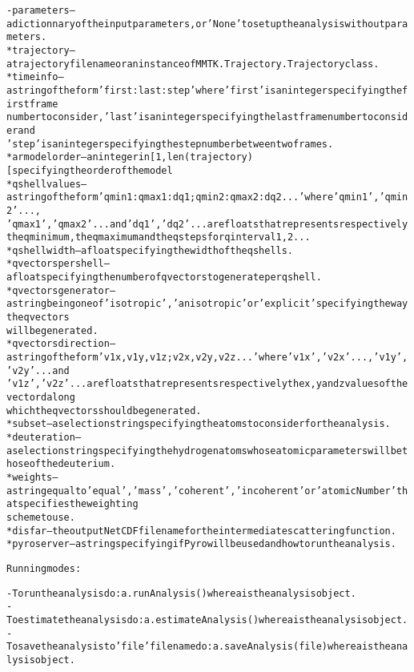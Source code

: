 \begin{alltt}
    - {\textbar}parameters{\textbar} -- a dictionnary of the input parameters, or 'None' to set up the analysis without parameters.
        * trajectory        -- a trajectory file name or an instance of MMTK.Trajectory.Trajectory class.
        * timeinfo          -- a string of the form 'first:last:step' where 'first' is an integer specifying the first frame 
                               number to consider, 'last' is an integer specifying the last frame number to consider and 
                               'step' is an integer specifying the step number between two frames.
        * armodelorder      -- an integer in [1, len(trajectory)[ specifying the order of the model
        * qshellvalues      -- a string of the form 'qmin1:qmax1:dq1;qmin2:qmax2:dq2...' where 'qmin1', 'qmin2' ... , 
                               'qmax1', 'qmax2' ... and 'dq1', 'dq2' ... are floats that represents respectively 
                               the q minimum, the q maximum and the q steps for q interval 1, 2 ...
        * qshellwidth       -- a float specifying the width of the q shells.
        * qvectorspershell  -- a float specifying the number of q vectors to generate per q shell.
        * qvectorsgenerator -- a string being one of 'isotropic', 'anisotropic' or 'explicit' specifying the way the q vectors
                               will be generated.
        * qvectorsdirection -- a string of the form 'v1x,v1y,v1z;v2x,v2y,v2z...' where 'v1x', 'v2x' ..., 'v1y', 'v2y' ... and
                               'v1z', 'v2z' ... are floats that represents respectively the x, y and z values of the vectord along 
                               which the q vectors should be generated.
        * subset            -- a selection string specifying the atoms to consider for the analysis.
        * deuteration       -- a selection string specifying the hydrogen atoms whose atomic parameters will be those of the deuterium.
        * weights           -- a string equal to 'equal', 'mass', 'coherent' , 'incoherent' or 'atomicNumber' that specifies the weighting
                               scheme to use.
        * disfar            -- the output NetCDF file name for the intermediate scattering function.
        * pyroserver        -- a string specifying if Pyro will be used and how to run the analysis.
    
Running modes:

    - To run the analysis do: a.runAnalysis() where a is the analysis object.
    - To estimate the analysis do: a.estimateAnalysis() where a is the analysis object.
    - To save the analysis to 'file' file name do: a.saveAnalysis(file) where a is the analysis object.
    
\end{alltt}


